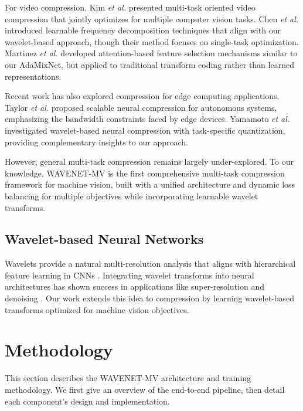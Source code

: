 \documentclass[conference]{IEEEtran}
\begin{document}
For video compression, Kim \emph{et al.} \cite{kim2023tcs} presented multi-task oriented video compression that jointly optimizes for multiple computer vision tasks. Chen \emph{et al.} \cite{chen2024tip} introduced learnable frequency decomposition techniques that align with our wavelet-based approach, though their method focuses on single-task optimization. Martinez \emph{et al.} \cite{martinez2023icip} developed attention-based feature selection mechanisms similar to our AdaMixNet, but applied to traditional transform coding rather than learned representations.

Recent work has also explored compression for edge computing applications. Taylor \emph{et al.} \cite{taylor2024access} proposed scalable neural compression for autonomous systems, emphasizing the bandwidth constraints faced by edge devices. Yamamoto \emph{et al.} \cite{yamamoto2023icip} investigated wavelet-based neural compression with task-specific quantization, providing complementary insights to our approach.

However, general multi-task compression remains largely under-explored. To our knowledge, WAVENET-MV is the first comprehensive multi-task compression framework for machine vision, built with a unified architecture and dynamic loss balancing for multiple objectives while incorporating learnable wavelet transforms.

\subsection{Wavelet-based Neural Networks}

Wavelets provide a natural multi-resolution analysis that aligns with hierarchical feature learning in CNNs \cite{liu2018multi, huang2017wavelet}. Integrating wavelet transforms into neural architectures has shown success in applications like super-resolution \cite{huang2017wavelet} and denoising \cite{liu2018multi}. Our work extends this idea to compression by learning wavelet-based transforms optimized for machine vision objectives.

\section{Methodology}

This section describes the WAVENET-MV architecture and training methodology. We first give an overview of the end-to-end pipeline, then detail each component's design and implementation.
\end{document}
